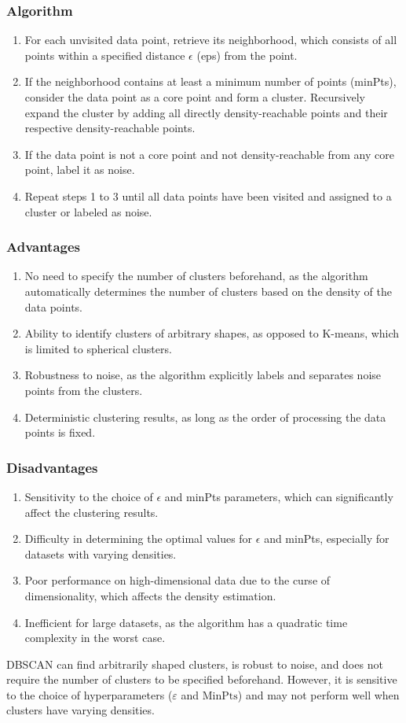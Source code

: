 \documentclass[12pt]{article}
\begin{document}
\subsubsection{Algorithm}
\begin{enumerate}
\item For each unvisited data point, retrieve its neighborhood, which consists of all points within a specified distance $\epsilon$ (eps) from the point.
\item If the neighborhood contains at least a minimum number of points (minPts), consider the data point as a core point and form a cluster. Recursively expand the cluster by adding all directly density-reachable points and their respective density-reachable points.
\item If the data point is not a core point and not density-reachable from any core point, label it as noise.
\item Repeat steps 1 to 3 until all data points have been visited and assigned to a cluster or labeled as noise.
\end{enumerate}

\subsubsection{Advantages}
\begin{enumerate}
\item No need to specify the number of clusters beforehand, as the algorithm automatically determines the number of clusters based on the density of the data points.
\item Ability to identify clusters of arbitrary shapes, as opposed to K-means, which is limited to spherical clusters.
\item Robustness to noise, as the algorithm explicitly labels and separates noise points from the clusters.
\item Deterministic clustering results, as long as the order of processing the data points is fixed.
\end{enumerate}

\subsubsection{Disadvantages}
\begin{enumerate}
\item Sensitivity to the choice of $\epsilon$ and minPts parameters, which can significantly affect the clustering results.
\item Difficulty in determining the optimal values for $\epsilon$ and minPts, especially for datasets with varying densities.
\item Poor performance on high-dimensional data due to the curse of dimensionality, which affects the density estimation.
\item Inefficient for large datasets, as the algorithm has a quadratic time complexity in the worst case.
\end{enumerate}
DBSCAN can find arbitrarily shaped clusters, is robust to noise, and does not require the number of clusters to be specified beforehand. However, it is sensitive to the choice of hyperparameters ($\varepsilon$ and $\text{MinPts}$) and may not perform well when clusters have varying densities.
\end{document}
